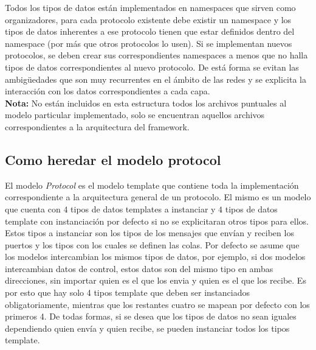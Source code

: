 \documentclass[10pt,a4paper]{article}
\begin{document}
Todos los tipos de datos están implementados en namespaces que sirven como organizadores, para cada protocolo existente debe existir un namespace y los tipos de datos inherentes a ese protocolo tienen que estar definidos dentro del namespace (por más que otros protocolos lo usen). Si se implementan nuevos protocolos, se deben crear sus correspondientes namespaces a menos que no halla tipos de datos correspondientes al nuevo protocolo. De está forma se evitan las ambigüedades que son muy recurrentes en el ámbito de las redes y se explicita la interacción con los datos correspondientes a cada capa. \\

\textbf{Nota: } No están incluidos en esta estructura todos los archivos puntuales al modelo particular implementado, solo se encuentran aquellos archivos correspondientes a la arquitectura del framework. \\

\subsection{Como heredar el modelo protocol}

El modelo \textit{Protocol} es el modelo template que contiene toda la implementación correspondiente a la arquitectura general de un protocolo. El mismo es un modelo que cuenta con $4$ tipos de datos templates a instanciar y $4$ tipos de datos template con instanciación por defecto si no se explicitaran otros tipos para ellos. Estos tipos a instanciar son los tipos de los mensajes que envían y reciben los puertos y los tipos con los cuales se definen las colas. Por defecto se asume que los modelos intercambian los mismos tipos de datos, por ejemplo, si dos modelos intercambian datos de control, estos datos son del mismo tipo en ambas direcciones, sin importar quien es el que los envia y quien es el que los recibe. Es por esto que hay solo 4 tipos template que deben ser instanciados obligatoriamente, mientras que los restantes cuatro se mapean por defecto con los primeros 4. De todas formas, si se desea que los tipos de datos no sean iguales dependiendo quien envía y quien recibe, se pueden instanciar todos los tipos template.\\
\end{document}
